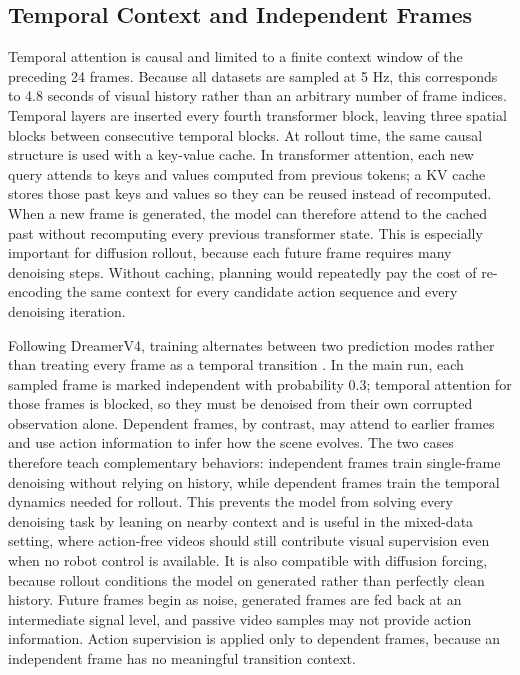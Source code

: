 \documentclass[12pt]{report}
\begin{document}
\subsection{Temporal Context and Independent Frames}
Temporal attention is causal and limited to a finite context window of the preceding 24 frames. Because all datasets are sampled at 5 Hz, this corresponds to 4.8 seconds of visual history rather than an arbitrary number of frame indices. Temporal layers are inserted every fourth transformer block, leaving three spatial blocks between consecutive temporal blocks. At rollout time, the same causal structure is used with a key-value cache. In transformer attention, each new query attends to keys and values computed from previous tokens; a KV cache stores those past keys and values so they can be reused instead of recomputed. When a new frame is generated, the model can therefore attend to the cached past without recomputing every previous transformer state. This is especially important for diffusion rollout, because each future frame requires many denoising steps. Without caching, planning would repeatedly pay the cost of re-encoding the same context for every candidate action sequence and every denoising iteration.

Following DreamerV4, training alternates between two prediction modes rather than treating every frame as a temporal transition \cite{hafner2025dreamerv4}. In the main run, each sampled frame is marked independent with probability 0.3; temporal attention for those frames is blocked, so they must be denoised from their own corrupted observation alone. Dependent frames, by contrast, may attend to earlier frames and use action information to infer how the scene evolves. The two cases therefore teach complementary behaviors: independent frames train single-frame denoising without relying on history, while dependent frames train the temporal dynamics needed for rollout. This prevents the model from solving every denoising task by leaning on nearby context and is useful in the mixed-data setting, where action-free videos should still contribute visual supervision even when no robot control is available. It is also compatible with diffusion forcing, because rollout conditions the model on generated rather than perfectly clean history. Future frames begin as noise, generated frames are fed back at an intermediate signal level, and passive video samples may not provide action information. Action supervision is applied only to dependent frames, because an independent frame has no meaningful transition context.
\end{document}
